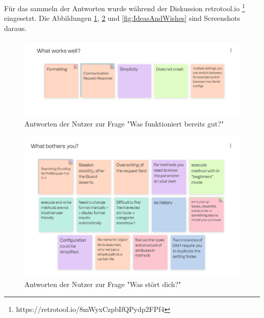 Für das sammeln der Antworten wurde während der Diskussion retrotool.io \footnote{https://retrotool.io/8mWyxCzpbIfQPydp2FPf4} eingesetzt.
Die Abbildungen \ref{fig:WhatWorksWell}, \ref{fig:WhatBothersYou} und \ref{fig:IdeasAndWishes} sind Screenshots daraus.



\begin{figure}[H]
   \centering
   \includegraphics[width=1.0\textwidth]{gfx/S1_RetroBoard_WhatWorksWell.png}
   \caption{
       Antworten der Nutzer zur Frage "Was funktioniert bereits gut?"
   }
   \label{fig:WhatWorksWell}
\end{figure}

\begin{figure}[H]
   \centering
   \includegraphics[width=1.0\textwidth]{gfx/S1_RetroBoard_WhatBothersYou.png}
   \caption{
       Antworten der Nutzer zur Frage "Was stört dich?"
   }
   \label{fig:WhatBothersYou}
\end{figure}

